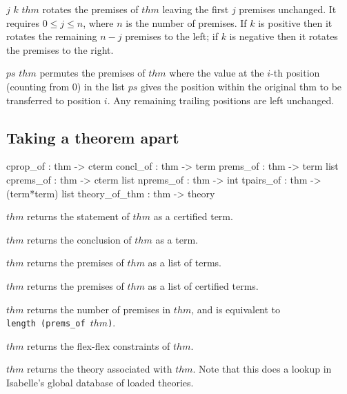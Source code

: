 \begin{ttdescription}
\item[\ttindexbold{permute_prems} $j$ $k$ $thm$] rotates the premises of $thm$
  leaving the first $j$ premises unchanged.  It
  requires $0\leq j\leq n$, where $n$ is the number of premises.  If $k$ is
  positive then it rotates the remaining $n-j$ premises to the left; if $k$ is
  negative then it rotates the premises to the right.

\item[\ttindexbold{rearrange_prems} $ps$ $thm$] permutes the premises of $thm$
   where the value at the $i$-th position (counting from $0$) in the list $ps$
   gives the position within the original thm to be transferred to position $i$.
   Any remaining trailing positions are left unchanged.
\end{ttdescription}


\subsection{Taking a theorem apart}
\begin{ttbox} 
cprop_of      : thm -> cterm
concl_of      : thm -> term
prems_of      : thm -> term list
cprems_of     : thm -> cterm list
nprems_of     : thm -> int
tpairs_of     : thm -> (term*term) list
theory_of_thm : thm -> theory
\end{ttbox}
\begin{ttdescription}
\item[\ttindexbold{cprop_of} $thm$] returns the statement of $thm$ as
  a certified term.
  
\item[\ttindexbold{concl_of} $thm$] returns the conclusion of $thm$ as
  a term.
  
\item[\ttindexbold{prems_of} $thm$] returns the premises of $thm$ as a
  list of terms.
  
\item[\ttindexbold{cprems_of} $thm$] returns the premises of $thm$ as
  a list of certified terms.

\item[\ttindexbold{nprems_of} $thm$] 
returns the number of premises in $thm$, and is equivalent to {\tt
  length~(prems_of~$thm$)}.

\item[\ttindexbold{tpairs_of} $thm$] returns the flex-flex constraints
  of $thm$.
  
\item[\ttindexbold{theory_of_thm} $thm$] returns the theory associated
  with $thm$.  Note that this does a lookup in Isabelle's global
  database of loaded theories.

\end{ttdescription}


